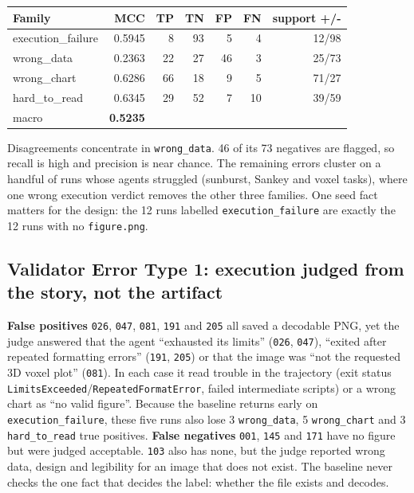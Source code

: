 \documentclass[11pt]{article}
\newcommand{\run}[1]{\texttt{#1}}
\begin{document}
\begin{center}
\begin{tabular}{lrrrrrr}
\toprule
Family & MCC & TP & TN & FP & FN & support +/- \\
\midrule
execution\_failure & 0.5945 & 8 & 93 & 5 & 4 & 12/98 \\
wrong\_data & 0.2363 & 22 & 27 & 46 & 3 & 25/73 \\
wrong\_chart & 0.6286 & 66 & 18 & 9 & 5 & 71/27 \\
hard\_to\_read & 0.6345 & 29 & 52 & 7 & 10 & 39/59 \\
\midrule
macro & \textbf{0.5235} & & & & & \\
\bottomrule
\end{tabular}
\end{center}

Disagreements concentrate in \texttt{wrong\_data}. 46 of its 73 negatives are
flagged, so recall is high and precision is near chance. The remaining errors
cluster on a handful of runs whose agents struggled (sunburst, Sankey and voxel
tasks), where one wrong execution verdict removes the other three families. One
seed fact matters for the design: the 12 runs labelled
\texttt{execution\_failure} are exactly the 12 runs with no \texttt{figure.png}.

\subsection{Validator Error Type 1: execution judged from the story, not the artifact}
\textbf{False positives} \run{026}, \run{047}, \run{081}, \run{191} and \run{205} all
saved a decodable PNG, yet the judge answered that the agent ``exhausted its
limits'' (\run{026}, \run{047}), ``exited after repeated formatting errors''
(\run{191}, \run{205}) or that the image was ``not the requested 3D voxel plot''
(\run{081}). In each case it read trouble in the trajectory (exit status
\texttt{LimitsExceeded}/\texttt{RepeatedFormatError}, failed intermediate
scripts) or a wrong chart as ``no valid figure''. Because the baseline returns
early on \texttt{execution\_failure}, these five runs also lose 3
\texttt{wrong\_data}, 5 \texttt{wrong\_chart} and 3 \texttt{hard\_to\_read} true
positives. \textbf{False negatives} \run{001}, \run{145} and \run{171} have no
figure but were judged acceptable. \run{103} also has none, but the judge reported
wrong data, design and legibility for an image that does not exist. The
baseline never checks the one fact that decides the label: whether the file
exists and decodes.
\end{document}

